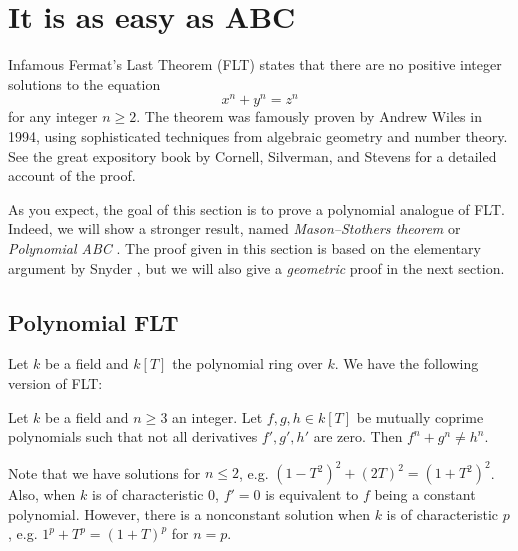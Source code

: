\section{It is as easy as ABC}
\label{sec:abc}

Infamous Fermat's Last Theorem (FLT) states that there are no positive integer solutions to the equation
\[
x^n + y^n = z^n
\]
for any integer \( n \ge 2 \). The theorem was famously proven by Andrew Wiles in 1994, using sophisticated techniques from algebraic geometry and number theory.
See the great expository book by Cornell, Silverman, and Stevens \cite{cornell2013modular} for a detailed account of the proof.

As you expect, the goal of this section is to prove a polynomial analogue of FLT.
Indeed, we will show a stronger result, named \emph{Mason--Stothers theorem} or \emph{Polynomial ABC} \cite{mason1984diophantine,stothers1981polynomial}.
The proof given in this section is based on the elementary argument by Snyder \cite{snyder2000alternate}, but we will also give a \emph{geometric} proof in the next section.

\subsection{Polynomial FLT}
\label{sec:abc-flt}

Let \( k \) be a field and \( k[T] \) the polynomial ring over \( k \).
We have the following version of FLT:

\begin{theorem}
\label{thm:abc-flt}
Let \( k \) be a field and \( n \geq 3 \) an integer.
Let \( f, g, h \in k[T] \) be mutually coprime polynomials such that not all derivatives \( f', g', h' \) are zero.
Then \( f^n + g^n \ne h^n \).
\end{theorem}
Note that we have solutions for $n \le 2$, e.g. $(1 - T^2)^2 + (2T)^2 = (1 + T^2)^2$.
Also, when $k$ is of characteristic $0$, $f' = 0$ is equivalent to $f$ being a constant polynomial.
However, there is a nonconstant solution when $k$ is of characteristic $p$, e.g. $1^p + T^p = (1 + T)^p$ for $n = p$.

